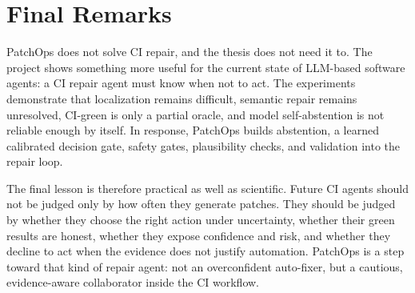 \section{Final Remarks}

PatchOps does not solve CI repair, and the thesis does not need it to. The project shows something more useful
for the current state of LLM-based software agents: a CI repair agent must know when not to act. The experiments
demonstrate that localization remains difficult, semantic repair remains unresolved, CI-green is only a partial
oracle, and model self-abstention is not reliable enough by itself. In response, PatchOps builds abstention,
a learned calibrated decision gate, safety gates, plausibility checks, and validation into the repair loop.

The final lesson is therefore practical as well as scientific. Future CI agents should not be judged only by
how often they generate patches. They should be judged by whether they choose the right action under
uncertainty, whether their green results are honest, whether they expose confidence and risk, and whether they
decline to act when the evidence does not justify automation. PatchOps is a step toward that kind of repair
agent: not an overconfident auto-fixer, but a cautious, evidence-aware collaborator inside the CI workflow.
